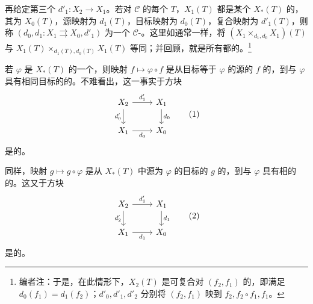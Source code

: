 再给定第三个 $d'_1:X_2\to X_1$。若对 $\mathcal C$ 的每个 $T$，$X_1(T)$ 都是某个 $X_*(T)$ 的，其为 $X_0(T)$，源映射为 $d_1(T)$，目标映射为 $d_0(T)$，复合映射为 $d'_1(T)$，则称 $(d_0,d_1:X_1\rightrightarrows X_0,d'_1)$ 为一个 $\mathcal C$-。这里如通常一样，将 $(X_1\times_{d_1,d_0}X_1)(T)$ 与 $X_1(T)\times_{d_1(T),d_0(T)}X_1(T)$ 等同；并回顾，就是所有都的。\footnote{编者注：于是，在此情形下，$X_2(T)$ 是可复合对 $(f_2,f_1)$ 的，即满足 $d_0(f_1)=d_1(f_2)$；$d'_0,d'_1,d'_2$ 分别将 $(f_2,f_1)$ 映到 $f_2,f_2\circ f_1,f_1$。}

若 $\varphi$ 是 $X_*(T)$ 的一个，则映射 $f\mapsto\varphi\circ f$ 是从目标等于 $\varphi$ 的源的 $f$ 的，到与 $\varphi$ 具有相同目标的的。不难看出，这一事实于方块
\[
\begin{tikzcd}
X_2\arrow[r,"d'_1"]\arrow[d,"d'_0"']&X_1\arrow[d,"d_0"]\\
X_1\arrow[r,"d_0"']&X_0
\end{tikzcd}\tag{1}
\]
是的。

同样，映射 $g\mapsto g\circ\varphi$ 是从 $X_*(T)$ 中源为 $\varphi$ 的目标的 $g$ 的，到与 $\varphi$ 具有相的的。这又于方块
\[
\begin{tikzcd}
X_2\arrow[r,"d'_1"]\arrow[d,"d'_2"']&X_1\arrow[d,"d_1"]\\
X_1\arrow[r,"d_1"']&X_0
\end{tikzcd}\tag{2}
\]
是的。

